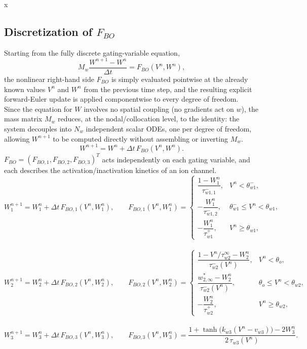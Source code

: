 \documentclass{Configuration_Files/PoliMi3i_thesis}
\begin{document}
x\subsection{Discretization of $F_{BO}$}
Starting from the fully discrete
gating-variable equation,
\[
M_w\frac{W^{n+1}-W^n}{\Delta t} = F_{BO}(V^n, W^n),
\]
the nonlinear right-hand side $F_{BO}$ is simply evaluated pointwise at the already known values $V^n$ and $W^n$ from
the previous time step, and the resulting explicit forward-Euler update is
applied componentwise to every degree of freedom.\\ 
Since the equation for $W$ involves no spatial coupling (no gradients
act on $w$), the mass matrix $M_w$ reduces, at the nodal/collocation
level, to the identity: the system decouples into $N_w$ independent
scalar ODEs, one per degree of freedom, allowing $W^{n+1}$ to be
computed directly without assembling or inverting $M_w$.
\[
W^{n+1} = W^n + \Delta t\, F_{BO}(V^n, W^n).
\]
$F_{BO} = (F_{BO,1}, F_{BO,2}, F_{BO,3})^T$ acts independently on each gating variable, and each describes the activation/inactivation kinetics of an ion channel.
\[
W_1^{n+1} = W_1^n + \Delta t\, F_{BO,1}(V^n, W_1^n),
\qquad
F_{BO,1}(V^n,W_1^n) =
\begin{cases}
\dfrac{1-W_1^n}{\tau^-_{w1,1}}, & V^n < \theta^-_{w1}, \\[12pt]
-\dfrac{W_1^n}{\tau^-_{w1,2}}, & \theta^-_{w1} \le V^n < \theta_{w1}, \\[12pt]
-\dfrac{W_1^n}{\tau^+_{w1}}, & V^n \ge \theta_{w1},
\end{cases}
\]
\\
\[
W_2^{n+1} = W_2^n + \Delta t\, F_{BO,2}(V^n, W_2^n),
\qquad
F_{BO,2}(V^n,W_2^n) =
\begin{cases}
\dfrac{1-V^n/\tau^\infty_{w2}-W_2^n}{\tau^-_{w2}(V^n)}, & V^n < \theta_o, \\[12pt]
\dfrac{w^*_{2,\infty}-W_2^n}{\tau^-_{w2}(V^n)}, & \theta_o \le V^n < \theta_{w2}, \\[12pt]
-\dfrac{W_2^n}{\tau^+_{w2}}, & V^n \ge \theta_{w2},
\end{cases}
\]
\\
\[
W_3^{n+1} = W_3^n + \Delta t\, F_{BO,3}(V^n, W_3^n),
\qquad
F_{BO,3}(V^n,W_3^n) = \frac{1+\tanh\big(k_{w3}(V^n-v_{w3})\big) - 2W_3^n}{2\,\tau_{w3}(V^n)}.
\]


\end{document}
